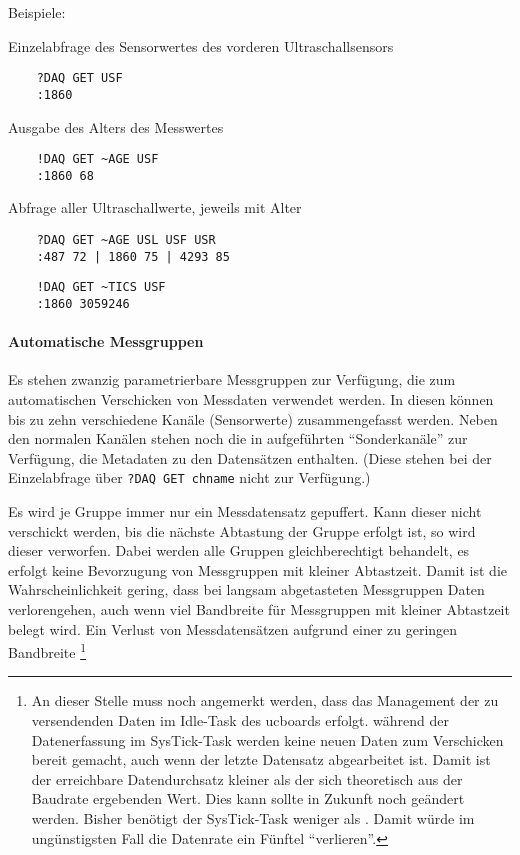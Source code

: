 Beispiele:

Einzelabfrage des Sensorwertes des vorderen Ultraschallsensors
\begin{verbatim}
	?DAQ GET USF
	:1860
\end{verbatim}

Ausgabe des Alters des Messwertes
\begin{verbatim}
	!DAQ GET ~AGE USF
	:1860 68
\end{verbatim}

Abfrage aller Ultraschallwerte, jeweils mit Alter
\begin{verbatim}
	?DAQ GET ~AGE USL USF USR
	:487 72 | 1860 75 | 4293 85
\end{verbatim}



\begin{verbatim}
	!DAQ GET ~TICS USF
	:1860 3059246
\end{verbatim}







\paragraph{Automatische Messgruppen}

Es stehen zwanzig parametrierbare Messgruppen zur Verfügung, die zum automatischen Verschicken von Messdaten verwendet werden. In diesen können bis zu zehn verschiedene Kanäle (Sensorwerte) zusammengefasst werden. Neben den normalen Kanälen stehen noch die in  aufgeführten "`Sonderkanäle"' zur Verfügung, die Metadaten zu den Datensätzen enthalten. (Diese stehen bei der Einzelabfrage über \verb|?DAQ GET chname| nicht zur Verfügung.)

Es wird je Gruppe immer nur ein Messdatensatz gepuffert. Kann dieser nicht verschickt werden, bis die nächste Abtastung der Gruppe erfolgt ist, so wird dieser verworfen. Dabei werden alle Gruppen gleichberechtigt behandelt, \dah es erfolgt keine Bevorzugung von Messgruppen mit kleiner Abtastzeit. Damit ist die Wahrscheinlichkeit gering, dass bei langsam abgetasteten Messgruppen Daten verlorengehen, auch wenn viel Bandbreite für Messgruppen mit kleiner Abtastzeit belegt wird. Ein Verlust von Messdatensätzen aufgrund einer zu geringen Bandbreite \footnote{An dieser Stelle muss noch angemerkt werden, dass das Management der zu versendenden Daten im Idle-Task des ucboards erfolgt. \Dah während der Datenerfassung im SysTick-Task werden keine neuen Daten zum Verschicken bereit gemacht, auch wenn der letzte Datensatz abgearbeitet ist. Damit ist der erreichbare Datendurchsatz kleiner als der sich theoretisch aus der Baudrate ergebenden Wert. Dies kann \bzw sollte in Zukunft noch geändert werden. Bisher benötigt der SysTick-Task weniger als . Damit würde im ungünstigsten Fall die Datenrate ein Fünftel "`verlieren"'.}


